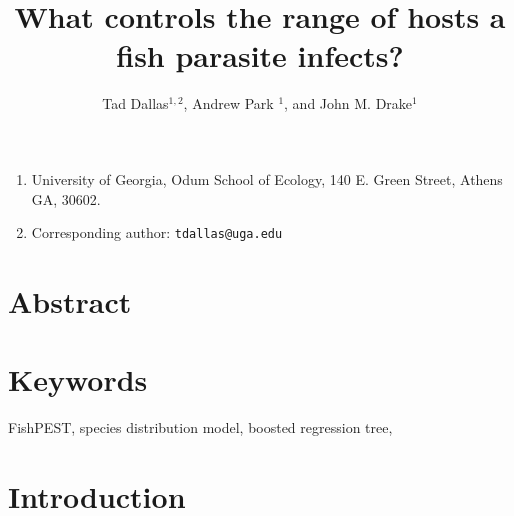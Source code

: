 \documentclass[12pt]{article}
\title{ What controls the range of hosts a fish parasite infects?}
\author{Tad Dallas$^{1,2}$, Andrew Park $^{1}$, and John M. Drake$^{1}$}
\date{}
\begin{document}
\setcounter{page}{1}
\maketitle{}
\vspace{-0.5cm}

\begin{enumerate}
  \item University of Georgia, Odum School of Ecology, 140 E. Green Street, Athens GA, 30602. 
  \item Corresponding author: \texttt{tdallas@uga.edu}
\end{enumerate}

\linenumbers
\doublespacing

\section*{Abstract}





\section*{Keywords}
FishPEST, species distribution model, boosted regression tree, 



 
\section*{Introduction}

\end{document}
